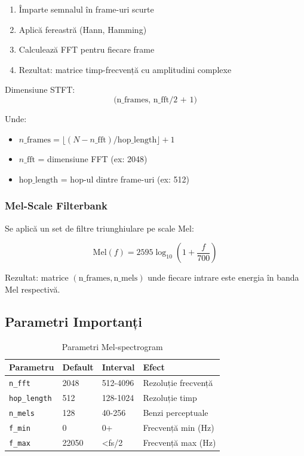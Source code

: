 \documentclass[12pt,a4paper,oneside]{book}
\begin{document}
\begin{enumerate}
    \item Împarte semnalul în frame-uri scurte
    \item Aplică fereastră (Hann, Hamming)
    \item Calculează FFT pentru fiecare frame
    \item Rezultat: matrice timp-frecvență cu amplitudini complexe
\end{enumerate}

Dimensiune STFT:
$$\text{(n\_frames, n\_fft/2 + 1)}$$

Unde:
\begin{itemize}
    \item $n\_\text{frames} = \lfloor (N - n\_\text{fft}) / \text{hop\_length} \rfloor + 1$
    \item $n\_\text{fft}$ = dimensiune FFT (ex: 2048)
    \item $\text{hop\_length}$ = hop-ul dintre frame-uri (ex: 512)
\end{itemize}

\subsubsection{Mel-Scale Filterbank}

Se aplică un set de filtre triunghiulare pe scale Mel:

$$\text{Mel}(f) = 2595 \log_{10}\left(1 + \frac{f}{700}\right)$$

Rezultat: matrice $(\text{n\_frames}, \text{n\_mels})$ unde fiecare intrare este energia în banda Mel respectivă.

\subsection{Parametri Importanți}

\begin{table}[H]
\centering
\begin{tabularx}{\textwidth}{|l|l|l|X|}
\hline
\textbf{Parametru} & \textbf{Default} & \textbf{Interval} & \textbf{Efect} \\
\hline
\texttt{n\_fft} & 2048 & 512-4096 & Rezoluție frecvență \\
\hline
\texttt{hop\_length} & 512 & 128-1024 & Rezoluție timp \\
\hline
\texttt{n\_mels} & 128 & 40-256 & Benzi perceptuale \\
\hline
\texttt{f\_min} & 0 & 0+ & Frecvență min (Hz) \\
\hline
\texttt{f\_max} & 22050 & <fs/2 & Frecvență max (Hz) \\
\hline
\end{tabularx}
\caption{Parametri Mel-spectrogram}
\end{table}
\end{document}
